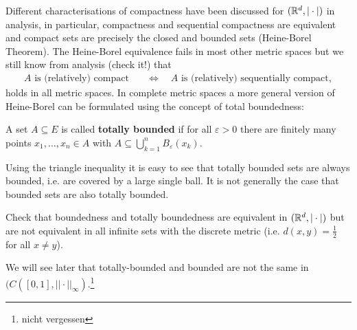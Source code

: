 Different characterisations of compactness have been discussed for $(\mathbb{R}^d,|\cdot|)$ in analysis, in particular, compactness and sequential compactness are equivalent and compact sets are precisely the closed and bounded sets (Heine-Borel Theorem). The Heine-Borel equivalence fails in most other metric spaces but we still know from analysis (check it!) that
\begin{align*}
	A\text{ is (relatively) compact}\quad& \Longleftrightarrow \quad A\text{ is (relatively) sequentially compact},
\end{align*}
holds in all metric spaces. In complete metric spaces a more general version of Heine-Borel can be formulated using the concept of total boundedness:
\begin{ldef}
\begin{deff}
	A set $A\subseteq E$ is called \textbf{totally bounded} if for all $\varepsilon>0$ there are finitely many points $x_1,...,x_n\in A$ with $A \subseteq \bigcup\limits_{k=1}^n B_{\varepsilon}(x_k)$. 
\end{deff}
\end{ldef}	
Using the triangle inequality it is easy to see that totally bounded sets are always bounded, i.e. are covered by a large single ball. It is not generally the case that bounded sets are also totally bounded.
\begin{luebung}
	Check that boundedness and totally boundedness are equivalent in $(\mathbb{R}^d,|\cdot|)$ but are not equivalent in all infinite sets with the discrete metric (i.e. $d(x,y)=\frac{1}{2}$ for all $x\neq y$).
\end{luebung}
We will see later that totally-bounded and bounded are not the same in $(C([0,1],||\cdot||_\infty)$.\footnote{nicht vergessen}\smallskip

